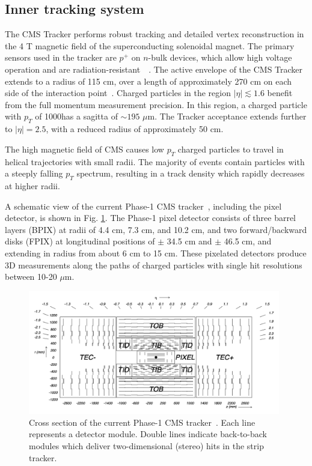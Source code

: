 \subsection{Inner tracking system}

The CMS Tracker performs robust tracking and detailed vertex reconstruction in the 4 T magnetic field of the superconducting solenoidal magnet. The primary sensors used in the tracker are $p^+$ on $n$-bulk devices, which allow high voltage operation and are radiation-resistant~\cite{CERN-LHCC-98-006}~\cite{CERN-LHCC-2017-009-tracker-phase2-tdr}. The active envelope of the CMS Tracker extends to a radius of 115 cm, over a length of approximately 270 cm on each side of the interaction point~\cite{CERN-LHCC-98-006}.
Charged particles in the region $|\eta| \lesssim 1.6$ benefit from the full momentum measurement precision. In this region, a charged particle with $p_T$ of 1000\GeV has a sagitta of $\sim 195$ $\mu$m. The Tracker acceptance extends further to $|\eta| = 2.5$, with a reduced radius of approximately 50 cm.

The high magnetic field of CMS causes low $p_{T}$ charged particles to travel in helical trajectories with small radii. The majority of events contain particles with a steeply falling $p_{T}$ spectrum, resulting in a track density which rapidly decreases at higher radii. 

A schematic view of the current Phase-1 CMS tracker~\cite{CMS-TDR-011-pixel}, including the pixel detector, is shown in Fig. \ref{fig:phase-1-tdr-tracker-schematic}. The Phase-1 pixel detector consists of three barrel layers (BPIX) at radii of 4.4 cm, 7.3 cm, and 10.2 cm, and two forward/backward disks (FPIX) at longitudinal positions of $\pm$ 34.5 cm and $\pm$ 46.5 cm, and extending in radius from about 6 cm to 15 cm. These pixelated detectors produce 3D measurements along the paths of charged particles with single hit resolutions between 10-20 $\mu$m. 


\begin{figure}[ht]
    \centering
    \includegraphics[width=11cm]{figures/ch-2-cern-cms/phase-1-tdr-tracker-schematic.png}
    \caption[Cross section of the current Phase-1 CMS tracker.]{Cross section of the current Phase-1 CMS tracker~\cite{CMS-TDR-011-pixel}. Each line represents a detector module. Double lines indicate back-to-back modules which deliver two-dimensional (stereo) hits in the strip tracker.}
    \label{fig:phase-1-tdr-tracker-schematic}
\end{figure}

